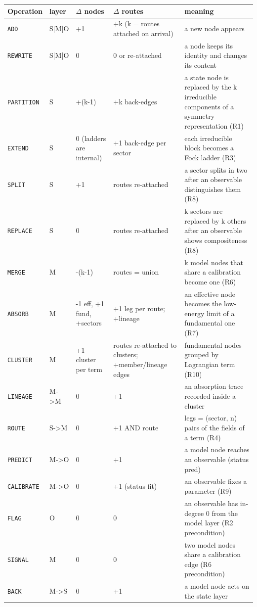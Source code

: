 \begin{longtable}{@{}p{1.7cm}p{2.2cm}p{2.3cm}p{3.0cm}p{5.4cm}@{}}\toprule
Operation & layer & $\Delta$ nodes & $\Delta$ routes & meaning \\\midrule\endhead
\texttt{ADD} & S|M|O & +1 & +k (k = routes attached on arrival) & a new node appears \\
\texttt{REWRITE} & S|M|O & 0 & 0 or re-attached & a node keeps its identity and changes its content \\
\texttt{PARTITION} & S & +(k-1) & +k back-edges & a state node is replaced by the k irreducible components of a symmetry representation (R1) \\
\texttt{EXTEND} & S & 0 (ladders are internal) & +1 back-edge per sector & each irreducible block becomes a Fock ladder (R3) \\
\texttt{SPLIT} & S & +1 & routes re-attached & a sector splits in two after an observable distinguishes them (R8) \\
\texttt{REPLACE} & S & 0 & routes re-attached & k sectors are replaced by k others after an observable shows compositeness (R8) \\
\texttt{MERGE} & M & -(k-1) & routes = union & k model nodes that share a calibration become one (R6) \\
\texttt{ABSORB} & M & -1 eff, +1 fund, +sectors & +1 leg per route; +lineage & an effective node becomes the low-energy limit of a fundamental one (R7) \\
\texttt{CLUSTER} & M & +1 cluster per term & routes re-attached to clusters; +member/lineage edges & fundamental nodes grouped by Lagrangian term (R10) \\
\texttt{LINEAGE} & M->M & 0 & +1 & an absorption trace recorded inside a cluster \\
\texttt{ROUTE} & S->M & 0 & +1 AND route & legs = (sector, n) pairs of the fields of a term (R4) \\
\texttt{PREDICT} & M->O & 0 & +1 & a model node reaches an observable (status pred) \\
\texttt{CALIBRATE} & M->O & 0 & +1 (status fit) & an observable fixes a parameter (R9) \\
\texttt{FLAG} & O & 0 & 0 & an observable has in-degree 0 from the model layer (R2 precondition) \\
\texttt{SIGNAL} & M & 0 & 0 & two model nodes share a calibration edge (R6 precondition) \\
\texttt{BACK} & M->S & 0 & +1 & a model node acts on the state layer \\

\end{longtable}
